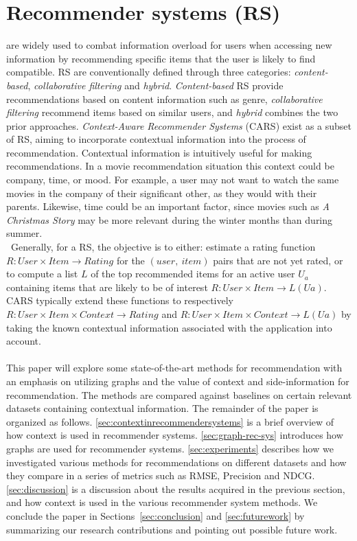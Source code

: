 \chapter{Recommender systems (RS)}\label{ch:introduction}
are widely used to combat information overload for users when accessing new information by recommending specific items that the user is likely to find compatible\cite{YouTubeNeural,IndustryPerspective}.
RS are conventionally defined through three categories: \textit{content-based}, \textit{collaborative filtering} and \textit{hybrid}.
\textit{Content-based} RS provide recommendations based on content information such as genre, \textit{collaborative filtering} recommend items based on similar users, and \textit{hybrid} combines the two prior approaches\cite{ContextSurvey2020}.
\textit{Context-Aware Recommender Systems} (CARS) exist as a subset of RS, aiming to incorporate contextual information into the process of recommendation.
Contextual information is intuitively useful for making recommendations.
In a movie recommendation situation this context could be company, time, or mood.
For example, a user may not want to watch the same movies in the company of their significant other, as they would with their parents.
Likewise, time could be an important factor, since movies such as \textit{A Christmas Story} may be more relevant during the winter months than during summer.\\\
Generally, for a RS, the objective is to either: estimate a rating function $R: User \times Item \rightarrow Rating$ for the $(user, \ item)$ pairs that are not yet rated, or to compute a list $L$ of the top recommended items for an active user $U_a$ containing items that are likely to be of interest $R: User \times Item \rightarrow L(Ua)$\cite{RecommenderHandbook2015}.
CARS typically extend these functions to respectively $R: User \times Item \times Context \rightarrow Rating$ and $R: User \times Item \times Context \rightarrow L(Ua)$ by taking the known contextual information associated with the application into account.
\\\\
This paper will explore some state-of-the-art methods for recommendation with an emphasis on utilizing graphs and the value of context and side-information for recommendation.
The methods are compared against baselines on certain relevant datasets containing contextual information.
The remainder of the paper is organized as follows. 
\autoref{sec:contextinrecommendersystems} is a brief overview of how context is used in recommender systems.
\autoref{sec:graph-rec-sys} introduces how graphs are used for recommender systems.
\autoref{sec:experiments} describes how we investigated various methods for recommendations on different datasets and how they compare in a series of metrics such as RMSE, Precision and NDCG.
\autoref{sec:discussion} is a discussion about the results acquired in the previous section, and how context is used in the various recommender system methods.
We conclude the paper in Sections~\ref{sec:conclusion} and \ref{sec:futurework} by summarizing our research contributions and pointing out possible future work.
